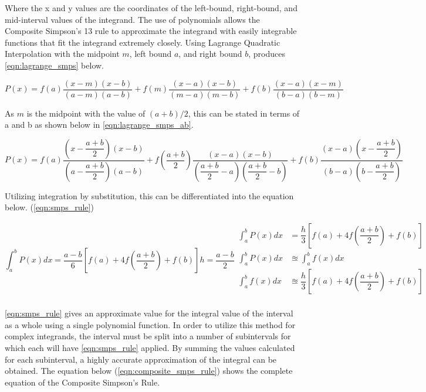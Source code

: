 \documentclass{paper}
\begin{document}
Where the x and y values are the coordinates of the left-bound, right-bound, and mid-interval values of the integrand.
The use of polynomials allows the Composite Simpson's 13 rule to approximate the integrand with easily integrable functions that fit the integrand extremely closely.
Using Lagrange Quadratic Interpolation with the midpoint \(m\), left bound \(a\), and right bound \(b\), produces \ref{eqn:lagrange_smps} below.

\begin{equation}
    P(x) = f(a) \dfrac{(x - m)(x - b)}{(a - m)(a - b)} + f(m) \dfrac{(x - a)(x - b)}{(m - a)(m - b)} + f(b) \dfrac{(x - a)(x - m)}{(b - a)(b - m)}
    \label{eqn:lagrange_smps}
\end{equation}

As \(m\) is the midpoint with the value of \((a + b) / 2\), this can be stated in terms of a and b as shown below in \ref{eqn:lagrange_smps_ab}.

\begin{equation}
    P(x) = f(a) \dfrac{(x - \dfrac{a+b}{2})(x - b)}{(a - \dfrac{a+b}{2})(a - b)} + f(\dfrac{a+b}{2}) \dfrac{(x - a)(x - b)}{(\dfrac{a+b}{2} - a)(\dfrac{a+b}{2} - b)} + f(b) \dfrac{(x - a)(x - \dfrac{a+b}{2})}{(b - a)(b - \dfrac{a+b}{2})}
    \label{eqn:lagrange_smps_ab}
\end{equation}

Utilizing integration by substitution, this can be differentiated into the equation below. (\ref{eqn:smps_rule})

\begin{equation}
    \int_a^b P(x) dx = \dfrac{a - b}{6} [f(a) + 4f(\dfrac{a + b}{2}) + f(b)]
    h = \dfrac{a - b}{2}
    \begin{split}
        \int_a^b P(x) dx &= \dfrac{h}{3} [f(a) + 4f(\dfrac{a + b}{2}) + f(b)]   \\
        \int_a^b P(x) dx &\approxeq \int_a^b f(x) dx                            \\
        \int_a^b f(x) dx &\approxeq \dfrac{h}{3} [f(a) + 4f(\dfrac{a + b}{2}) + f(b)]   \\
    \end{split}
    \label{eqn:smps_rule}
\end{equation}

\ref{eqn:smps_rule} gives an approximate value for the integral value of the interval as a whole using a single polynomial function.
In order to utilize this method for complex integrands, the interval must be split into a number of subintervals for which each will have \ref{eqn:smps_rule} applied.
By summing the values calculated for each subinterval, a highly accurate approximation of the integral can be obtained.
The equation below (\ref{eqn:composite_smps_rule}) shows the complete equation of the Composite Simpson's Rule.
\end{document}

